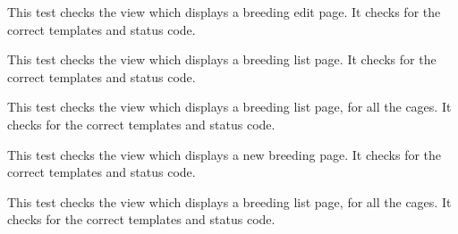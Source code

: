 \documentclass[letterpaper,10pt,english]{sphinxmanual}
\begin{document}
\begin{fulllineitems}
\begin{fulllineitems}
\label{api:mousedb.animal.tests.BreedingViewTests.test_breeding_edit}
This test checks the view which displays a breeding edit page.  It checks for the correct templates and status code.

\end{fulllineitems}



\begin{fulllineitems}
\label{api:mousedb.animal.tests.BreedingViewTests.test_breeding_list}
This test checks the view which displays a breeding list page.  It checks for the correct templates and status code.

\end{fulllineitems}



\begin{fulllineitems}
\label{api:mousedb.animal.tests.BreedingViewTests.test_breeding_list_all}
This test checks the view which displays a breeding list page, for all the cages.  It checks for the correct templates and status code.

\end{fulllineitems}



\begin{fulllineitems}
\label{api:mousedb.animal.tests.BreedingViewTests.test_breeding_new}
This test checks the view which displays a new breeding page.  It checks for the correct templates and status code.

\end{fulllineitems}



\begin{fulllineitems}
\label{api:mousedb.animal.tests.BreedingViewTests.test_timed_mating_list}
This test checks the view which displays a breeding list page, for all the cages.  It checks for the correct templates and status code.

\end{fulllineitems}


\end{fulllineitems}
\end{document}
